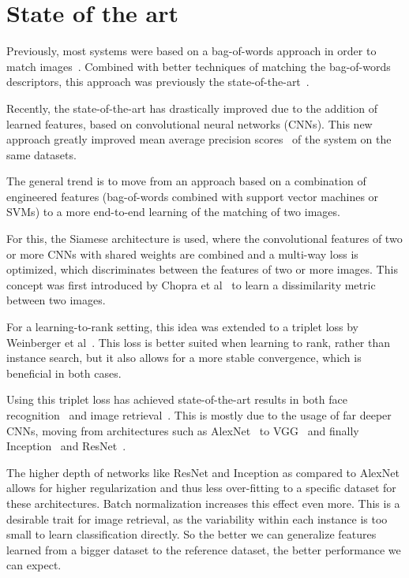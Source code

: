 \documentclass[fleqn]{article}
\begin{document}
\section{State of the art}
Previously, most systems were based on a bag-of-words approach
in order to match images~\cite{philbin_object_2007}.
Combined with better techniques of matching the bag-of-words descriptors,
this approach was previously the state-of-the-art~\cite{mikulik_learning_2013}.

Recently, the state-of-the-art has drastically improved due to the
addition of learned features, based on convolutional neural networks
(CNNs).
This new approach greatly improved
mean average precision scores~\cite{gordo_deep_2016} of the system
on the same datasets.

The general trend is to move from an approach based on a combination of
engineered features (bag-of-words combined with
support vector machines or SVMs) to a more end-to-end learning of
the matching of two images.

For this, the Siamese architecture is used, where the convolutional
features of two or more CNNs with shared weights are combined and a
multi-way loss is optimized, which discriminates between the features
of two or more images.
This concept was first introduced by
Chopra et al~\cite{chopra_learning_2005} to learn a dissimilarity metric
between two images.

For a learning-to-rank setting, this idea was extended to a triplet loss
by Weinberger et al~\cite{weinberger_distance_2006}.
This loss is better suited when learning to rank, rather than instance
search, but it also allows for a more stable convergence, which is
beneficial in both cases.

Using this triplet loss has achieved state-of-the-art results in both
face recognition~\cite{schroff_facenet:_2015} and
image retrieval~\cite{gordo_deep_2016}. This is mostly due to the usage
of far deeper CNNs, moving from architectures such as
AlexNet~\cite{krizhevsky_imagenet_2012} to VGG~\cite{simonyan_very_2014}
and finally Inception~\cite{szegedy_inception-v4_2016} and
ResNet~\cite{he_deep_2015}.

The higher depth of networks like ResNet and Inception as compared to
AlexNet allows for higher regularization and thus less over-fitting
to a specific dataset for these architectures. Batch normalization
increases this effect even more. This is a desirable trait for image
retrieval, as the variability within each instance is too small to
learn classification directly. So the better we can generalize
features learned from a bigger dataset to the reference dataset,
the better performance we can expect.
\end{document}
